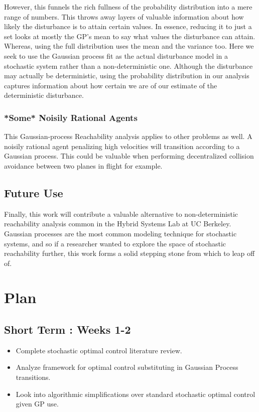 \documentclass[a4paper]{article}
\begin{document}
However, this funnels the rich fullness of the probability distribution into a mere range of numbers. This throws away layers of valuable information about how likely the disturbance is to attain certain values. In essence, reducing it to just a set looks at mostly the GP's mean to say what values the disturbance can attain. Whereas, using the full distribution uses the mean and the variance too. Here we seek to use the Gaussian process fit as the actual disturbance model in a stochastic system rather than a non-deterministic one. Although the disturbance may actually be deterministic, using the probability distribution in our analysis captures information about how certain we are of our estimate of the deterministic disturbance.
\subsubsection{*Some* Noisily Rational Agents}
This Gaussian-process Reachability analysis applies to other problems as well. A noisily rational agent penalizing high velocities will transition according to a Gaussian process. This could be valuable when performing decentralized collision avoidance between two planes in flight for example.
\subsection{Future Use}
Finally, this work will contribute a valuable alternative to non-deterministic reachability analysis common in the Hybrid Systems Lab at UC Berkeley. Gaussian processes are the most common modeling technique for stochastic systems, and so if a researcher wanted to explore the space of stochastic reachability further, this work forms a solid stepping stone from which to leap off of.

\section{Plan}
\subsection{Short Term : Weeks 1-2}
\begin{itemize}
\item Complete stochastic optimal control literature review.
\item Analyze framework for optimal control substituting in Gaussian Process transitions.
\item Look into algorithmic simplifications over standard stochastic optimal control given GP use.
\end{itemize}
\end{document}
